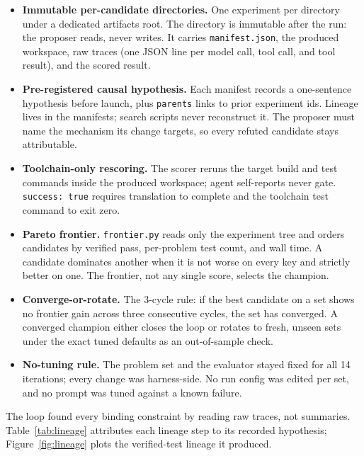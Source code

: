 \documentclass[11pt]{article}
\begin{document}
\begin{itemize}
\item \textbf{Immutable per-candidate directories.} One experiment per
directory under a dedicated artifacts root. The directory is immutable
after the run: the proposer reads, never writes. It carries
\texttt{manifest.json}, the produced workspace, raw traces (one JSON
line per model call, tool call, and tool result), and the scored
result.
\item \textbf{Pre-registered causal hypothesis.} Each manifest records
a one-sentence hypothesis before launch, plus \texttt{parents} links to
prior experiment ids. Lineage lives in the manifests; search scripts
never reconstruct it. The proposer must name the mechanism its change
targets, so every refuted candidate stays attributable.
\item \textbf{Toolchain-only rescoring.} The scorer reruns the target
build and test commands inside the produced workspace; agent
self-reports never gate. \texttt{success: true} requires translation to
complete and the toolchain test command to exit zero.
\item \textbf{Pareto frontier.} \texttt{frontier.py} reads only the
experiment tree and orders candidates by verified pass, per-problem
test count, and wall time. A candidate dominates another when it is
not worse on every key and strictly better on one. The frontier, not
any single score, selects the champion.
\item \textbf{Converge-or-rotate.} The 3-cycle rule: if the best
candidate on a set shows no frontier gain across three consecutive
cycles, the set has converged. A converged champion either closes the
loop or rotates to fresh, unseen sets under the exact tuned defaults
as an out-of-sample check.
\item \textbf{No-tuning rule.} The problem set and the evaluator stayed
fixed for all 14 iterations; every change was harness-side. No run
config was edited per set, and no prompt was tuned against a known
failure.
\end{itemize}

The loop found every binding constraint by reading raw traces, not
summaries. Table~\ref{tab:lineage} attributes each lineage step to its
recorded hypothesis; Figure~\ref{fig:lineage} plots the verified-test
lineage it produced.
\end{document}
